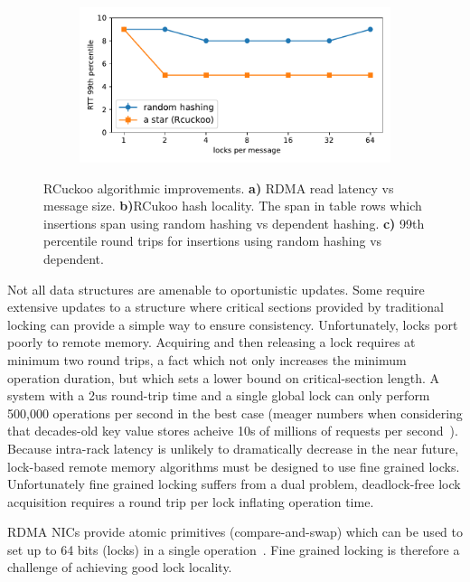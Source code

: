 \begin{figure}[t!]
\begin{subfigure}{.33\textwidth}
    \end{subfigure}
    \begin{subfigure}{.33\textwidth}
      \centering
      \includegraphics[width=.9\linewidth]{fig/search_dependence.pdf}
    \end{subfigure}

    \caption{RCuckoo algorithmic improvements. \textbf{a)}
    RDMA read latency vs message size. \textbf{b)}RCukoo
    hash locality. The span in table rows which insertions
    span using random hashing vs dependent hashing.
    \textbf{c)} 99th percentile round trips for insertions
    using random hashing vs dependent.}
    \label{fig:rcuckoo}
\end{figure}


Not all data structures are amenable to oportunistic
updates. Some require extensive updates to a structure where
critical sections provided by traditional locking can
provide a simple way to ensure consistency. Unfortunately,
locks port poorly to remote memory. 
Acquiring and then releasing a lock requires at minimum two
round trips, a fact which not only increases the minimum
operation duration, but which sets a lower bound on
critical-section length. A system with a 2us round-trip time
and a single global lock can only perform 500,000 operations
per second in the best case (meager numbers when considering
that decades-old key value stores acheive 10s of millions of
requests per second~\cite{herd}). Because intra-rack latency
is unlikely to dramatically decrease in the near future,
lock-based remote memory algorithms must be designed to use
fine grained locks. Unfortunately fine grained locking
suffers from a dual problem, deadlock-free lock acquisition
requires a round trip per lock inflating operation time. 

RDMA NICs provide atomic primitives (compare-and-swap) which
can be used to set up to 64 bits (locks) in a single
operation~\cite{melanox-operations}.  Fine grained locking
is therefore a challenge of achieving good lock locality.


